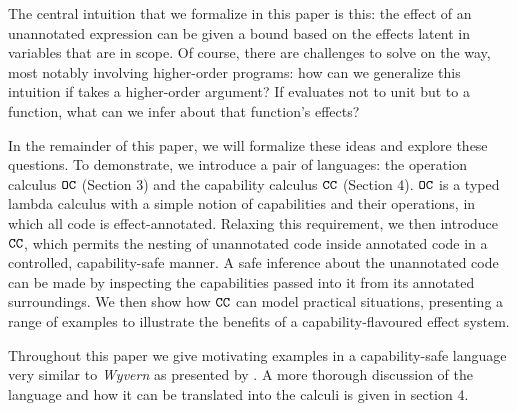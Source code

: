 The central intuition that we formalize in this paper is this: the effect of an unannotated expression can be given a bound based on the effects latent in variables that are in scope.
Of course, there are challenges to solve on the way, most notably involving higher-order programs: how can we generalize this intuition if  takes a higher-order argument?
If  evaluates not to unit but to a function, what can we infer about that function's effects?

In the remainder of this paper, we will formalize these ideas and explore these questions.
To demonstrate, we introduce a pair of languages: the operation calculus $\mathtt{OC}$ (Section 3) and the capability calculus $\mathtt{CC}$ (Section 4).
$\mathtt{OC}$ is a typed lambda calculus with a simple notion of capabilities and their operations, in which all code is effect-annotated.
Relaxing this requirement, we then introduce $\mathtt{CC}$, which permits the nesting of unannotated code inside annotated code in a controlled, capability-safe manner.
A safe inference about the unannotated code can be made by inspecting the capabilities passed into it from its annotated surroundings.
We then show how $\mathtt{CC}$ can model practical situations, presenting a range of examples to illustrate the benefits of a capability-flavoured effect system.

Throughout this paper we give motivating examples in a capability-safe language very similar to \textit{Wyvern} as presented by \citet{nistor13}.
A more thorough discussion of the language and how it can be translated into the calculi is given in section 4.
